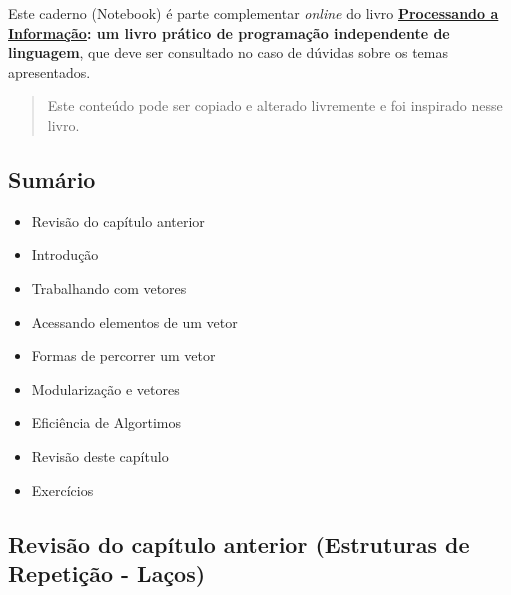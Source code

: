 \documentclass[12pt,a4paper]{article}
\providecommand{\tightlist}{%
      \setlength{\itemsep}{0pt}\setlength{\parskip}{0pt}}
\begin{document}
Este caderno (Notebook) é parte complementar \emph{online} do livro
\textbf{\href{https://editora.ufabc.edu.br/matematica-e-ciencias-da-computacao/58-processando-a-informacao}{Processando
a Informação}: um livro prático de programação independente de
linguagem}, que deve ser consultado no caso de dúvidas sobre os temas
apresentados.

\begin{quote}
Este conteúdo pode ser copiado e alterado livremente e foi inspirado
nesse livro.
\end{quote}

    \hypertarget{sumuxe1rio}{%
\subsection{Sumário}\label{sumuxe1rio}}

\begin{itemize}
\tightlist
\item
  Revisão do capítulo anterior
\item
  Introdução
\item
  Trabalhando com vetores
\item
  Acessando elementos de um vetor
\item
  Formas de percorrer um vetor
\item
  Modularização e vetores
\item
  Eficiência de Algortimos
\item
  Revisão deste capítulo
\item
  Exercícios
\end{itemize}

    \hypertarget{revisuxe3o-do-capuxedtulo-anterior-estruturas-de-repetiuxe7uxe3o---lauxe7os}{%
\subsection{Revisão do capítulo anterior (Estruturas de Repetição -
Laços)}\label{revisuxe3o-do-capuxedtulo-anterior-estruturas-de-repetiuxe7uxe3o---lauxe7os}}
\end{document}
